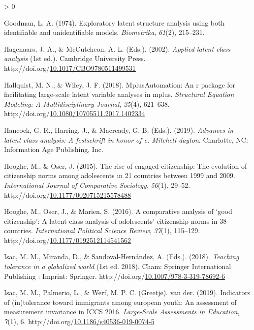 \documentclass[12pt,a4paper,oneside]{reedthesis}
\newlength{\cslhangindent}
\newenvironment{CSLReferences}[2] %
 {%
  \setlength{\parindent}{0pt}
  \ifodd #1 \everypar{\setlength{\hangindent}{\cslhangindent}}\ignorespaces\fi
  \ifnum #2 > 0
  \setlength{\parskip}{#2\baselineskip}
  \fi
 }%
 {}
\begin{document}
\begin{CSLReferences}{1}{0}
\leavevmode\hypertarget{ref-goodman_exploratory_1974}{}%
Goodman, L. A. (1974). Exploratory latent structure analysis using both identifiable and unidentifiable models. \emph{Biometrika}, \emph{61}(2), 215--231.

\leavevmode\hypertarget{ref-hagenaars_applied_2002}{}%
Hagenaars, J. A., \& McCutcheon, A. L. (Eds.). (2002). \emph{Applied latent class analysis} (1st ed.). Cambridge University Press. http://doi.org/\href{https://doi.org/10.1017/CBO9780511499531}{10.1017/CBO9780511499531}

\leavevmode\hypertarget{ref-hallquist_mplusautomation_2018}{}%
Hallquist, M. N., \& Wiley, J. F. (2018). {MplusAutomation}: An r package for facilitating large-scale latent variable analyses in mplus. \emph{Structural Equation Modeling: A Multidisciplinary Journal}, \emph{25}(4), 621--638. http://doi.org/\href{https://doi.org/10.1080/10705511.2017.1402334}{10.1080/10705511.2017.1402334}

\leavevmode\hypertarget{ref-hancock_advances_2019}{}%
Hancock, G. R., Harring, J., \& Macready, G. B. (Eds.). (2019). \emph{Advances in latent class analysis: A festschrift in honor of c. Mitchell dayton}. Charlotte, {NC}: Information Age Publishing, Inc.

\leavevmode\hypertarget{ref-hooghe_rise_2015}{}%
Hooghe, M., \& Oser, J. (2015). The rise of engaged citizenship: The evolution of citizenship norms among adolescents in 21 countries between 1999 and 2009. \emph{International Journal of Comparative Sociology}, \emph{56}(1), 29--52. http://doi.org/\href{https://doi.org/10.1177/0020715215578488}{10.1177/0020715215578488}

\leavevmode\hypertarget{ref-hooghe_comparative_2016}{}%
Hooghe, M., Oser, J., \& Marien, S. (2016). A comparative analysis of {`good citizenship'}: A latent class analysis of adolescents' citizenship norms in 38 countries. \emph{International Political Science Review}, \emph{37}(1), 115--129. http://doi.org/\href{https://doi.org/10.1177/0192512114541562}{10.1177/0192512114541562}

\leavevmode\hypertarget{ref-isac_teaching_2018}{}%
Isac, M. M., Miranda, D., \& Sandoval-Hernández, A. (Eds.). (2018). \emph{Teaching tolerance in a globalized world} (1st ed. 2018). Cham: Springer International Publishing : Imprint: Springer. http://doi.org/\href{https://doi.org/10.1007/978-3-319-78692-6}{10.1007/978-3-319-78692-6}

\leavevmode\hypertarget{ref-isac_indicators_2019}{}%
Isac, M. M., Palmerio, L., \& Werf, M. P. C. (Greetje). van der. (2019). Indicators of (in)tolerance toward immigrants among european youth: An assessment of measurement invariance in {ICCS} 2016. \emph{Large-Scale Assessments in Education}, \emph{7}(1), 6. http://doi.org/\href{https://doi.org/10.1186/s40536-019-0074-5}{10.1186/s40536-019-0074-5}


\end{CSLReferences}
\end{document}
